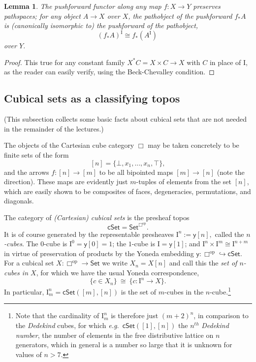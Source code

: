\documentclass[12pt]{article}
\newcommand{\eg}{\emph{e.g.}}
\newcommand{\psh}[1]{\ensuremath{\mathsf{Set}^{#1^{\mathrm{op}}}}}
\newcommand{\Set}{\ensuremath{\mathsf{Set}}}
\newcommand{\cSet}{\ensuremath{\mathsf{cSet}}}
\newcommand{\yon}{\ensuremath{\mathsf{y}}} %
\newcommand{\op}[1]{\ensuremath{{#1}^{\mathrm{op}}}}
\newcommand{\hook}{\ensuremath{\hookrightarrow}}
\renewcommand{\to}{\ensuremath{\rightarrow}}
\newcommand{\I}{\ensuremath{\mathrm{I}}}
\newtheorem{lemma}[theorem]{Lemma}
\theoremstyle{remark}
\theoremstyle{definition}
\begin{document}
\begin{lemma}\label{lemma:pathspacepushforward}
The pushforward functor along any map $f : X\to Y$ preserves pathspaces; for any object $A \to X$ over $X$, the pathobject of the pushforward $f_*A$ is (canonically isomorphic to) the pushforward of the pathobject,
\[
(f_*A)^\I \cong f_*(A^\I)\,
\]
over $Y$.
\end{lemma}
\begin{proof}
This true for any constant family $X^*C = X\times C \to X$ with $C$ in place of $\I$, as the reader can easily verify, using the Beck-Chevalley condition.
\end{proof}

\subsection*{Cubical sets as a classifying topos}\label{subsec:classtopos}

(This subsection collects some basic facts about cubical sets that are not needed in the remainder of the lectures.)  

The objects of the Cartesian cube category $\Box$ may be taken concretely to be finite sets of the form $$[n] = \{\bot, x_1, ..., x_n, \top\},$$ and the arrows $f : [n] \to [m]$ to be all bipointed maps $[m]\to [n]$ (note the direction).  These maps are evidently just $m$-tuples of elements from the set $[n]$, which are easily shown to be composites of faces, degeneracies, permutations, and diagonals. 

The category of \emph{(Cartesian) cubical sets} is the presheaf topos
\[
\cSet =  \psh{\Box}.
\]
It is of course generated by the representable presheaves $\I^n := \yon[n],$ called the \emph{$n$-cubes}.  The $0$-cube is $\I^0 = \yon[0] =1$; the $1$-cube is $\I = \yon[1]$; and $\I^n \times \I^m \cong \I^{n+m}$ in virtue of preservation of products by the Yoneda embedding $\yon : \op{\Box} \hook\cSet$.  For a cubical set $X: \op{\Box} \to \Set$ we write $X_n = X[n]$ and call this the \emph{set of $n$-cubes in $X$}, for which we have the usual Yoneda correspondence,
\[
\{c \in X_n \} \ \cong\ \{c : \I^n \to X\}.
\]
In particular, $\I^n_m = \cSet([m],[n])$ is the set of $m$-cubes in the $n$-cube.\footnote{Note that the cardinality of $\I^n_m$ is therefore just $(m+2)^n$, in comparison to the \emph{Dedekind} cubes, for which \eg\ $\cSet([1],[n])$ the $n^{th}$ \emph{Dedekind number}, the number of elements in the free distributive lattice on $n$ generators, which in general is  a number so large that it is unknown for values of $n>7$.} 
\end{document}
